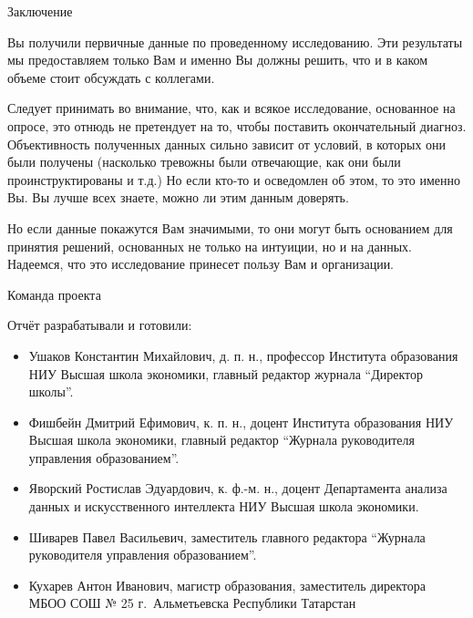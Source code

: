 \begin{frame}{Заключение}

\tiny 
Вы получили первичные данные по проведенному исследованию. Эти результаты мы предоставляем только Вам и именно Вы должны решить, что и в каком объеме стоит обсуждать с коллегами. 
\smallskip

Следует принимать во внимание, что, как и всякое исследование, основанное на опросе, это отнюдь не претендует на то, чтобы поставить окончательный диагноз. Объективность полученных данных сильно зависит от условий, в которых они были получены (насколько тревожны были отвечающие, как они были проинструктированы и т.д.) Но если кто-то и осведомлен об этом, то это именно Вы.  Вы лучше всех знаете, можно ли этим данным доверять.
\smallskip

Но  если данные покажутся Вам значимыми, то они могут быть основанием для принятия решений, основанных не только на интуиции, но и на данных. Надеемся, что это исследование принесет пользу Вам и организации.


\end{frame}

\begin{frame}{Команда проекта}

\tiny 
Отчёт разрабатывали и готовили:

\begin{itemize}

\item Ушаков Константин Михайлович, д. п. н., профессор Института образования НИУ Высшая школа экономики, главный редактор журнала ``Директор школы''.

\item Фишбейн Дмитрий Ефимович, к. п. н., доцент Института образования НИУ Высшая школа экономики, главный редактор ``Журнала руководителя управления образованием''.

\item Яворский Ростислав Эдуардович, к. ф.-м. н., доцент Департамента анализа данных и искусственного интеллекта НИУ Высшая школа экономики.

\item Шиварев Павел Васильевич, заместитель главного редактора ``Журнала руководителя управления образованием''.

\item Кухарев Антон Иванович, магистр образования, заместитель директора МБОО СОШ № 25 г.~Альметьевска Республики Татарстан

\end{itemize}

\end{frame}


